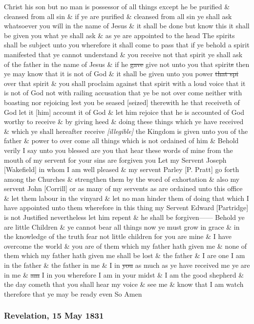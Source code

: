 Christ his son but no man is possessor of all things except he be purified \& cleansed from all sin \& if ye are purified \& cleansed from all sin ye shall ask whatsoever you will in the name of Jesus \& it shall be done but know this it shall be given you what ye shall ask \& as ye are appointed to the head The spirits shall be subject unto you wherefore it shall come to pass that if ye behold a spirit manifested that ye cannot understand \& you receive not that spirit ye shall ask of the father in the name of Jesus \& if he \sout{gave} give not unto you that spirit\sout{s} then ye may know that it is not of God \& it shall be given unto you power \sout{that spi} over that spirit \& you shall proclaim against that spirit with a loud voice that it is not of God not with railing accusation that ye be not over come neither with boasting nor rejoicing lest you be seased [seized] therewith he that receiveth of God let it [him] account it of God \& let him rejoice that he is accounted of God worthy to receive \& by giving heed \& doing these things which ye have received \& which ye shall hereafter receive \textit{[illegible]} the Kingdom is given unto you of the father \& power to over come all things which is not ordained of him \& Behold verily I say unto you blessed are you that hear these words of mine from the mouth of my servent for your sins are forgiven you Let my Servent Joseph [Wakefield] in whom I am well pleased \& my servent Parley [P. Pratt] go forth among the Churches \& strengthen them by the word of exhortation \& also my servent John [Corrill] or as many of my servents as are ordained unto this office \& let them labour in the vinyard \& let no man hinder them of doing that which I have appointed unto them wherefore in this thing my Servent Edward [Partridge] is not Justified nevertheless let him repent \& he shall be forgiven------ Behold ye are little Children \& ye cannot bear all things now ye must grow in grace \& in the knowledge of the truth fear not little children for you are mine \& I have overcome the world \& you are of them which my father hath given me \& none of them which my father hath given me shall be lost \& the father \& I are one I am in the father \& the father in me \& I in \sout{you} as much as ye have received me ye are in me \& \sout{am} I in you wherefore I am in your midst \& I am the good shepherd \& the day cometh that you shall hear my voice \& see me \& know that I am watch therefore that ye may be ready even So Amen
				
		\subsubsection{Revelation, 15 May 1831}
			\label{EMS-1831-JS-15-MAY-1831}
		
